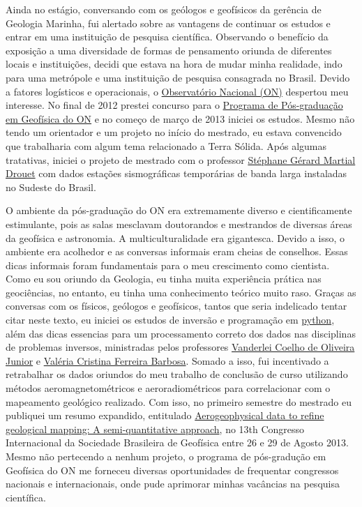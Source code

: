 \documentclass[10pt,a4paper,oneside]{book}
\begin{document}
Ainda no estágio, conversando com os geólogos e geofísicos da gerência de Geologia Marinha, fui alertado sobre as vantagens de continuar os estudos e entrar em uma instituição de pesquisa científica. Observando o benefício da exposição a uma diversidade de formas de pensamento oriunda de diferentes locais e instituições, decidi que estava na hora de mudar minha realidade, indo para uma metrópole e uma instituição de pesquisa consagrada no Brasil. Devido a fatores logísticos e operacionais, o \href{https://www.gov.br/observatorio/pt-br}{Observatório Nacional (ON)} despertou meu interesse. No final de 2012 prestei concurso para o \href{https://www.gov.br/observatorio/pt-br/assuntos/programas-academicos/pos-graduacao-em-geofisica}{Programa de Pós-graduação em Geofísica do ON} e no começo de março de 2013 iniciei os estudos. Mesmo não tendo um orientador e um projeto no início do mestrado, eu estava convencido que trabalharia com algum tema relacionado a Terra Sólida. Após algumas tratativas, iniciei o projeto de mestrado com o professor \href{http://lattes.cnpq.br/0563544084744404}{Stéphane Gérard Martial Drouet} com dados estações sismográficas temporárias de banda larga instaladas no Sudeste do Brasil.

O ambiente da pós-graduação do ON era extremamente diverso e cientificamente estimulante, pois as salas mesclavam doutorandos e mestrandos de diversas áreas da geofísica e astronomia. A multiculturalidade era gigantesca. Devido a isso, o ambiente era acolhedor e as conversas informais eram cheias de conselhos. Essas dicas informais foram fundamentais para o meu crescimento como cientista. Como eu sou oriundo da Geologia, eu tinha muita experiência prática nas geociências, no entanto, eu tinha uma conhecimento teórico muito raso. Graças as conversas com os físicos, geólogos e geofísicos, tantos que seria indelicado tentar citar neste texto, eu iniciei os estudos de inversão e programação em \href{https://www.python.org/}{python}, além das dicas essencias para um processamento correto dos dados nas disciplinas de problemas inversos, ministradas pelos professores \href{http://lattes.cnpq.br/4332841435949533}{Vanderlei Coelho de Oliveira Junior} e \href{http://lattes.cnpq.br/0391036221142471}{Valéria Cristina Ferreira Barbosa}. Somado a isso, fui incentivado a retrabalhar os dados oriundos do meu trabalho de conclusão de curso utilizando métodos aeromagnetométricos e aeroradiométricos para correlacionar com o mapeamento geológico realizado. Com isso, no primeiro semestre do mestrado eu publiquei um resumo expandido, entitulado \href{https://doi.org/10.1190/sbgf2013-129}{Aerogeophysical data to refine geological mapping: A semi-quantitative approach}, no 13th Congresso Internacional da Sociedade Brasileira de Geofísica entre 26 e 29 de Agosto 2013. Mesmo não pertecendo a nenhum projeto, o programa de pós-gradução em Geofísica do ON me forneceu diversas oportunidades de frequentar congressos nacionais e internacionais, onde pude aprimorar minhas vacâncias na pesquisa científica.
\end{document}

